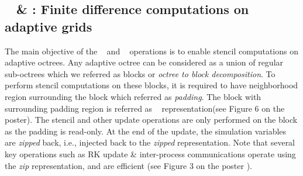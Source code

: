 \documentclass[10pt, conference]{IEEEtran} %
\begin{document}
\subsection{\unzip~ \& \zip : Finite difference computations on adaptive grids}
\label{sec:unzip_and_zip}
The main objective of the \unzip~ and \zip~ operations is to enable stencil computations on adaptive octrees. Any adaptive octree can be considered as a union of regular sub-octrees which we referred  as blocks or \emph{octree to block decomposition}. To perform stencil computations on these blocks, it is required to have neighborhood region surrounding the block which referred as \emph{padding}. The block with surrounding  padding region is referred as \unzip~ representation(see Figure 6 on the poster). The stencil and other update operations are only performed on the block as the padding is read-only. At the end of the update, the simulation variables are {\em zipped} back, i.e., injected back to the {\em zipped} representation. Note that several key operations such as RK update \& inter-process communications operate using the \textit{zip} representation, and are efficient (see Figure 3 on the poster ).  








\end{document}
